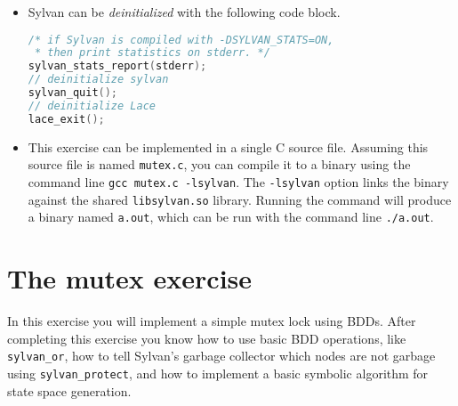 \documentclass{article}
\begin{document}
\begin{itemize}
\begin{lstlisting}[language=c]
/* initialize Sylvan's node table and operations cache
 * with at least 2^20 entries, and at most 2^25 entries */
sylvan_init_package(1LL<<20,1LL<<25,1LL<<20,1LL<<25);
sylvan_init_bdd();
        \end{lstlisting}
    \item Sylvan can be \emph{deinitialized} with the following code block.
        \begin{lstlisting}[language=c]
/* if Sylvan is compiled with -DSYLVAN_STATS=ON,
 * then print statistics on stderr. */
sylvan_stats_report(stderr);
// deinitialize sylvan
sylvan_quit();
// deinitialize Lace
lace_exit();
        \end{lstlisting}
    \item This exercise can be implemented in a single C source file. Assuming this source file is named \texttt{mutex.c}, you can compile it to a binary using the command line \texttt{gcc mutex.c -lsylvan}. The \texttt{-lsylvan} option links the binary against the shared \texttt{libsylvan.so} library. Running the command will produce a binary named \texttt{a.out}, which can be run with the command line \texttt{./a.out}.

\end{itemize}

\section{The mutex exercise}
In this exercise you will implement a simple mutex lock using BDDs. After completing this exercise you know how to use basic BDD operations, like \texttt{sylvan\_or}, how to tell Sylvan's garbage collector which nodes are not garbage using \texttt{sylvan\_protect}, and how to implement a basic symbolic algorithm for state space generation.
\end{document}
